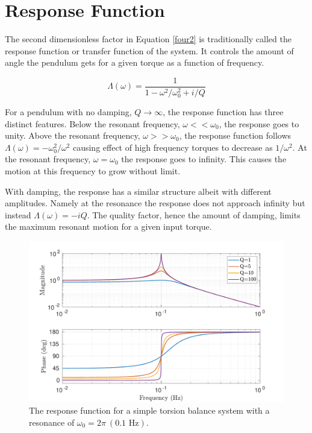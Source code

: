 \documentclass{book}
\begin{document}
\section{Response Function}\label{resp}

\quad The second dimensionless factor in Equation \ref{four2} is traditionally called the response function or transfer function of the system. It controls the amount of angle the pendulum gets for a given torque as a function of frequency. 

\begin{equation}
\Lambda(\omega)= \frac{1}{1-\omega^2/\omega_0^2 +i/Q} \label{four3}
\end{equation}

For a pendulum with no damping, $Q\rightarrow\infty$, the response function has three distinct features. Below the resonant frequency, $\omega << \omega_0$, the response goes to unity. Above the resonant frequency, $\omega >> \omega_0$, the response function follows $\Lambda(\omega)=-\omega_0^2/\omega^2$ causing effect of high frequency torques to decrease as $1/\omega^2$. At the resonant frequency, $\omega=\omega_0$ the response goes to infinity. This causes the motion at this frequency to grow without limit.

With damping, the response has a similar structure albeit with different amplitudes. Namely at the resonance the response does not approach infinity but instead $\Lambda(\omega)=-i Q$. The quality factor, hence the amount of damping, limits the maximum resonant motion for a given input torque. 

\begin{figure}[!h]
\begin{centering}
\includegraphics[width=\textwidth]{ResponseFunction.pdf}
\caption{The response function for a simple torsion balance system with a resonance of $\omega_0=2\pi\ (0.1 \text{ Hz})$.}\label{respPlot}
\end{centering}
\end{figure}
\end{document}
